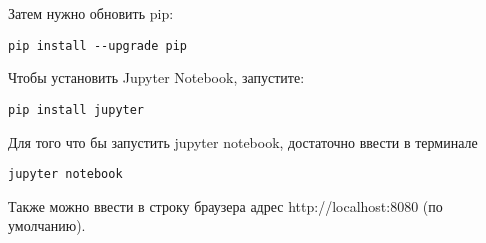 Затем нужно обновить pip:
 \begin{lstlisting}
pip install --upgrade pip
\end{lstlisting}
Чтобы установить Jupyter Notebook, запустите:
 \begin{lstlisting}
pip install jupyter
\end{lstlisting}

Для того что бы запустить jupyter notebook, достаточно ввести в терминале 
 \begin{lstlisting}
jupyter notebook
\end{lstlisting}

Также можно ввести в строку браузера адрес http://localhost:8080 (по умолчанию).